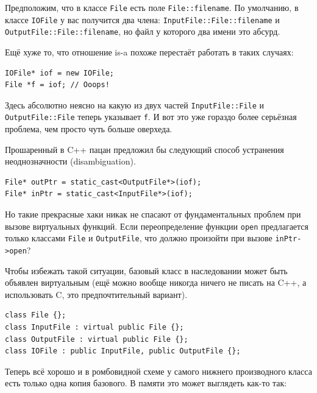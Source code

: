 \documentclass[a4paper,12pt,oneside]{article}
\begin{document}
Предположим, что в классе \lstinline!File! есть поле \lstinline!File::filename!. По умолчанию, в классе \lstinline!IOFile! у вас получится два члена: \lstinline!InputFile::File::filename! и \lstinline!OutputFile::File::filename!, но файл у которого два имени это абсурд. 

Ещё хуже то, что отношение is-a похоже перестаёт работать в таких случаях:

\begin{lstlisting}
IOFile* iof = new IOFile;
File *f = iof; // Ooops!
\end{lstlisting}

Здесь абсолютно неясно на какую из двух частей \lstinline!InputFile::File! и \lstinline!OutputFile::File! теперь указывает \lstinline!f!. И вот это уже гораздо более серьёзная проблема, чем просто чуть больше оверхеда.

Прошаренный в C++ пацан предложил бы следующий способ устранения неоднозначности (disambiguation).

\begin{lstlisting}
File* outPtr = static_cast<OutputFile*>(iof);
File* inPtr = static_cast<InputFile*>(iof);
\end{lstlisting}

Но такие прекрасные хаки никак не спасают от фундаментальных проблем при вызове виртуальных функций. Если переопределение функции \lstinline!open! предлагается только классами \lstinline!File! и \lstinline!OutputFile!, что должно произойти при вызове \lstinline!inPtr->open!?

Чтобы избежать такой ситуации, базовый класс в наследовании может быть объявлен виртуальным (ещё можно вообще никогда ничего не писать на C++, а использовать C, это предпочтительный вариант).

\begin{lstlisting}
class File {};
class InputFile : virtual public File {};
class OutputFile : virtual public File {};
class IOFile : public InputFile, public OutputFile {};
\end{lstlisting}

Теперь всё хорошо и в ромбовидной схеме у самого нижнего производного класса есть только одна копия базового. В памяти это может выглядеть как-то так:
\end{document}
